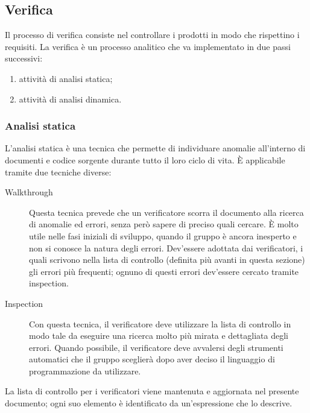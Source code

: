 \subsection{Verifica}
Il processo di verifica consiste nel controllare i prodotti in modo che rispettino i requisiti. %
La verifica è un processo analitico che va implementato in due passi successivi:
\begin{enumerate}
	\item attività di analisi statica;
	\item attività di analisi dinamica.
\end{enumerate}

	\subsubsection{Analisi statica}
	L'analisi statica è una tecnica che permette di individuare anomalie all'interno di documenti e codice sorgente durante tutto il loro ciclo di vita. È applicabile tramite due tecniche diverse:
	\begin{description}
		\item[Walkthrough] Questa tecnica prevede che un verificatore scorra il documento alla ricerca di anomalie ed errori, senza però sapere di preciso quali cercare. È molto utile nelle fasi iniziali di sviluppo, quando il gruppo è ancora inesperto e non si conosce la natura degli errori. Dev'essere adottata dai verificatori, i quali scrivono nella lista di controllo (definita più avanti in questa sezione) gli errori più frequenti; ognuno di questi errori dev'essere cercato tramite inspection.
		\item[Inspection] Con questa tecnica, il verificatore deve utilizzare la lista di controllo in modo tale da eseguire una ricerca molto più mirata e dettagliata degli errori. Quando possibile, il verificatore deve avvalersi degli strumenti automatici che il gruppo sceglierà dopo aver deciso il linguaggio di programmazione da utilizzare.
	\end{description}
	La lista di controllo per i verificatori viene mantenuta e aggiornata nel presente documento; ogni suo elemento è identificato da un'espressione che lo descrive.
